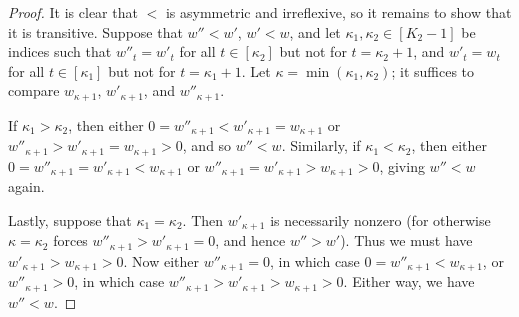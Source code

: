 \documentclass[11pt]{amsart}
\theoremstyle{definition}
\begin{document}
\begin{proof}
It is clear that $<$ is asymmetric and irreflexive, so it remains to show that it is transitive.
Suppose that $w'' < w'$, $w' < w$, and let $\kappa_1, \kappa_2 \in [K_2 - 1]$ be indices such that
$w''_t = w'_t$ for all $t \in [\kappa_2]$ but not for $t = \kappa_2 + 1$, and
$w'_t = w_t$ for all $t \in [\kappa_1]$ but not for $t = \kappa_1 + 1$.
Let $\kappa = \min(\kappa_1, \kappa_2)$; it suffices to compare
$w_{\kappa+1}$, $w'_{\kappa+1}$, and $w''_{\kappa+1}$.

If $\kappa_1 > \kappa_2$, then either
$0 = w''_{\kappa+1} < w'_{\kappa+1} = w_{\kappa+1}$
or
$w''_{\kappa+1} > w'_{\kappa+1} = w_{\kappa+1} > 0$,
and so $w'' < w$.
Similarly, if $\kappa_1 < \kappa_2$, then either
$0 = w''_{\kappa+1} = w'_{\kappa+1} < w_{\kappa+1}$
or
$w''_{\kappa+1} = w'_{\kappa+1} > w_{\kappa+1} > 0$,
giving $w'' < w$ again.

Lastly, suppose that $\kappa_1 = \kappa_2$.
Then $w'_{\kappa+1}$ is necessarily nonzero (for otherwise $\kappa = \kappa_2$ forces $w''_{\kappa+1} > w'_{\kappa+1} = 0$, and hence $w''>w'$).
Thus we must have
$w'_{\kappa+1} > w_{\kappa+1} > 0$.
Now either $w''_{\kappa+1} = 0$, in which case
$0 = w''_{\kappa+1} < w_{\kappa+1}$,
or $w''_{\kappa+1} > 0$, in which case
$w''_{\kappa+1} > w'_{\kappa+1} > w_{\kappa+1} > 0$.
Either way, we have $w'' < w$.
\end{proof}
\end{document}
